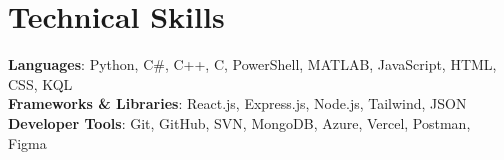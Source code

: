 \section{Technical Skills}
 \begin{itemize}[leftmargin=0.15in, label={}]
    \small{\item{
      \textbf{Languages}{: Python, C\#, C++, C, PowerShell, MATLAB, JavaScript, HTML, CSS, KQL} \\
      \textbf{Frameworks \& Libraries}{: React.js, Express.js, Node.js, Tailwind, JSON} \\
      \textbf{Developer Tools}{: Git, GitHub, SVN, MongoDB, Azure, Vercel, Postman, Figma} \\
      }}
\end{itemize} 